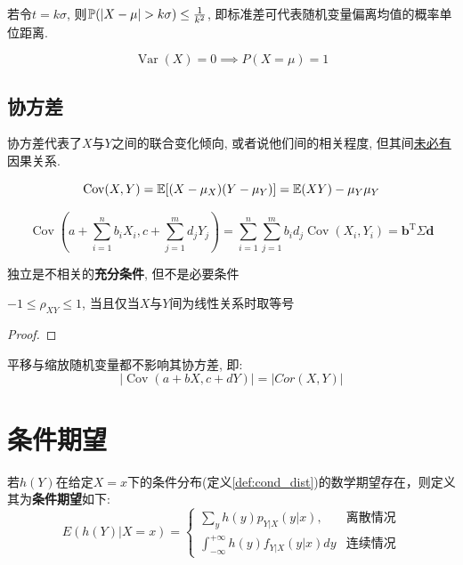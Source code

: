 \begin{remark}
    若令$t=k\sigma$, 则$\P(\left| X-\mu \right| >k\sigma)\le \frac{1}{k^{2}}$, 即标准差可代表随机变量偏离均值的概率单位距离.
\end{remark}

\begin{corollary}
    \[ \operatorname{Var}(X)=0 \implies P(X=\mu)=1 \]
\end{corollary}

\subsection{协方差}

协方差代表了$X$与$Y$之间的联合变化倾向, 或者说他们间的相关程度, 但其间\underline{未必有}因果关系.

\begin{theorem}
    \[ \operatorname{Cov} (X,Y)=\E[(X-\mu_X)(Y-\mu_Y)]=\E(XY)-\mu_Y \mu_Y \]
\end{theorem}

\begin{theorem}
    \[ \operatorname{Cov}(a+\sum_{i=1}^n b_i X_i,c+\sum_{j=1}^m d_j Y_j) = \sum_{i=1}^n\sum_{j=1}^m b_i d_j \operatorname{Cov}(X_i,Y_i) = \mathbf{b}^{\mathrm{T}}\Sigma \mathbf{d}\]
\end{theorem}

\begin{theorem}
    独立是不相关的\textbf{充分条件}, 但不是必要条件
\end{theorem}

\begin{theorem}
    $-1\le \rho_{XY} \le 1$, 当且仅当$X$与$Y$间为线性关系时取等号
\end{theorem}

\begin{proof}
\end{proof}

\begin{theorem}
    平移与缩放随机变量都不影响其协方差, 即:
    \[ \left| \operatorname{Cov}(a+ b X,c +d Y) \right| = \left| Cor(X,Y) \right|  \]
\end{theorem}

\section{条件期望}

\begin{definition}
    若$h(Y)$在给定$X=x$下的条件分布(定义\ref{def:cond_dist})的数学期望存在，则定义其为\textbf{条件期望}如下:
    \[ E(h(Y)|X=x) =\begin{cases}
            \sum_{y} h(y) p_{Y|X}(y|x),                    & \text{离散情况} \\
            \int_{-\infty}^{+\infty} h(y) f_{Y|X}(y|x) d y & \text{连续情况}
        \end{cases}\]
\end{definition}

